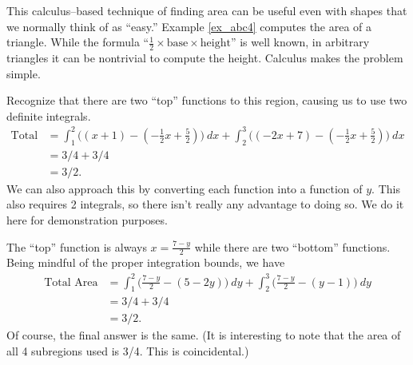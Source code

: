 This calculus--based technique of finding area can be useful even with shapes that we normally think of as ``easy.'' Example \ref{ex_abc4} computes the area of a triangle. While the formula ``$\frac12\times\text{base}\times\text{height}$'' is well known, in arbitrary triangles it can be nontrivial to compute the height. Calculus makes the problem simple.\\

{Recognize that there are two ``top'' functions to this region, causing us to use two definite integrals.
\begin{align*}
	\text{Total Area}
	&= \int_1^2\big((x+1)-(-\frac12x+\frac52)\big)\ dx + \int_2^3\big((-2x+7)-(-\frac12x+\frac52)\big)\ dx \\
	&= 3/4+3/4\\
	&=3/2.
\end{align*}
We can also approach this by converting each function into a function of $y$. This also requires 2 integrals, so there isn't really any advantage to doing so. We do it here for demonstration purposes.

The ``top'' function is always $x=\frac{7-y}2$ while there are two ``bottom'' functions. Being mindful of the proper integration bounds, we have
\begin{align*}
\text{Total Area} &= \int_1^2\big(\frac{7-y}2 - (5-2y)\big)\ dy + \int_2^3\big(\frac{7-y}2-(y-1)\big)\ dy \\
			&= 3/4 + 3/4\\
			&= 3/2.
\end{align*}
Of course, the final answer is the same. (It is interesting to note that the area of all 4 subregions used is 3/4. This is coincidental.)
}\\

